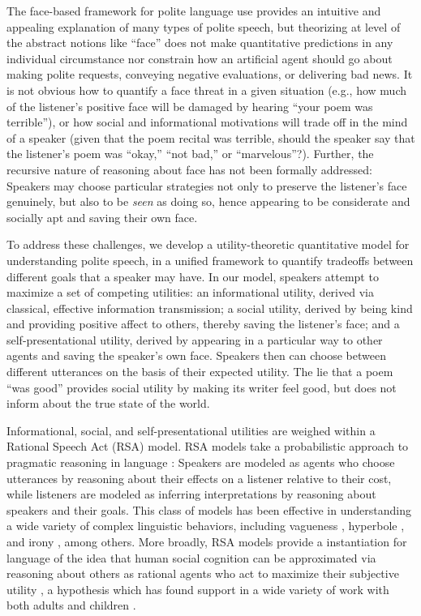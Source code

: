 \documentclass[12pt]{article}
\begin{document}
The face-based framework for polite language use provides an intuitive
and appealing explanation of many types of polite speech, but theorizing
at level of the abstract notions like \enquote{face} does not make
quantitative predictions in any individual circumstance nor constrain
how an artificial agent should go about making polite requests,
conveying negative evaluations, or delivering bad news. It is not
obvious how to quantify a face threat in a given situation (e.g., how
much of the listener's positive face will be damaged by hearing
\enquote{your poem was terrible}), or how social and informational
motivations will trade off in the mind of a speaker (given that the poem
recital was terrible, should the speaker say that the listener's poem
was \enquote{okay,} \enquote{not bad,} or \enquote{marvelous}?).
Further, the recursive nature of reasoning about face has not been
formally addressed: Speakers may choose particular strategies not only
to preserve the listener's face genuinely, but also to be \emph{seen} as
doing so, hence appearing to be considerate and socially apt and saving
their own face.


To address these challenges, we develop a utility-theoretic quantitative
model for understanding polite speech, in a unified framework to
quantify tradeoffs between different goals that a speaker may have. In
our model, speakers attempt to maximize a set of competing utilities: an
informational utility, derived via classical, effective information
transmission; a social utility, derived by being kind and providing
positive affect to others, thereby saving the listener's face; and a
self-presentational utility, derived by appearing in a particular way to
other agents and saving the speaker's own face. Speakers then can choose
between different utterances on the basis of their expected utility. The
lie that a poem \enquote{was good} provides social utility by making its
writer feel good, but does not inform about the true state of the world.

Informational, social, and self-presentational utilities are weighed
within a Rational Speech Act (RSA) model. RSA models take a
probabilistic approach to pragmatic reasoning in language \cite{frank2012, goodman2016}: 
Speakers are modeled as agents
who choose utterances by reasoning about their effects on a listener
relative to their cost, while listeners are modeled as inferring
interpretations by reasoning about speakers and their goals. This class
of models has been effective in understanding a wide variety of complex
linguistic behaviors, including vagueness \cite{lassiter2017adjectival},
hyperbole \cite{kao2014}, and irony \cite{kao2015}, among others. 
More broadly, RSA models provide a
instantiation for language of the idea that human social cognition can
be approximated via reasoning about others as rational agents who act to
maximize their subjective utility \cite{baker2009action}, a
hypothesis which has found support in a wide variety of work with both
adults and children \cite{jara2016naive, liu2017ten}.
\end{document}
